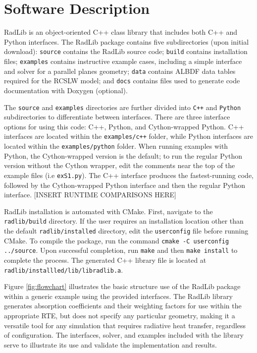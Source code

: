 \documentclass[preprint,12pt, a4paper]{elsarticle}
\begin{document}
\section{Software Description}
\label{s:architechture}

RadLib is an object-oriented C++ class library that includes both C++ and Python interfaces. The RadLib package contains five subdirectories (upon initial download): \texttt{source} contains the RadLib source code; \texttt{build} contains installation files; \texttt{examples} contains instructive example cases, including a simple interface and solver for a parallel planes geometry; \texttt{data} contains ALBDF data tables required for the RCSLW model; and \texttt{docs} contains files used to generate code documentation with Doxygen (optional). 

The \texttt{source} and \texttt{examples} directories are further divided into \texttt{C++} and \texttt{Python} subdirectories to differentiate between interfaces. There are three interface options for using this code: C++, Python, and Cython-wrapped Python. C++ interfaces are located within the \texttt{examples/c++} folder, while Python interfaces are located within the \texttt{examples/python} folder. When running examples with Python, the Cython-wrapped version is the default; to run the regular Python version without the Cython wrapper, edit the comments near the top of the example files (i.e \texttt{ex\textunderscore S1.py}). The C++ interface produces the fastest-running code, followed by the Cython-wrapped Python interface and then the regular Python interface. [INSERT RUNTIME COMPARISONS HERE]

RadLib installation is automated with CMake. First, navigate to the \texttt{radlib/build} directory. If the user requires an installation location other than the default \texttt{radlib/installed} directory, edit the \texttt{user\textunderscore config} file before running CMake. To compile the package, run the command \texttt{cmake -C user\textunderscore config ../source}. Upon successful completion, run \texttt{make} and then \texttt{make install} to complete the process. The generated C++ library file is located at \texttt{radlib/installled/lib/libradlib.a}. 

Figure \ref{fig:flowchart} illustrates the basic structure use of the RadLib package within a generic example using the provided interfaces. The RadLib library generates absorption coefficients and their weighting factors for use within the appropriate RTE, but does not specify any particular geometry, making it a versatile tool for any simulation that requires radiative heat transfer, regardless of configuration. The interfaces, solver, and examples included with the library serve to illustrate its use and validate the implementation and results. 
\end{document}
